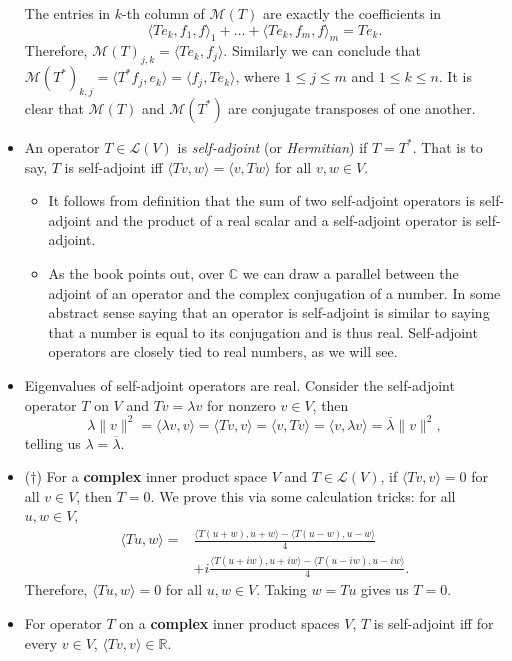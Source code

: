 \documentclass{article}
\newcommand{\R}{\mathbb{R}}
\newcommand{\C}{\mathbb{C}}
\newcommand{\conj}[1]{\overline{#1}}
\newcommand{\inp}[2]{\langle #1, #2 \rangle}
\newcommand{\nm}[1]{\| #1 \|}
\newcommand{\LV}{\mathcal{L}(V)}
\newcommand{\M}{\mathcal{M}}
\begin{document}
\begin{itemize}
    The entries in $k$-th column of $\M(T)$ are exactly the coefficients in
    $$\inp{Te_k,f_1}f_1+\dots+\inp{Te_k,f_m}f_m = Te_k.$$ Therefore, $\M(T)_{j,k} = \inp{Te_k}{f_j}$. Similarly we can conclude that $\M(T^*)_{k,j} = \inp{T^*f_j}{e_k} = \inp{f_j}{Te_k}$, where $1 \leq j \leq m$ and $1 \leq k \leq n$. It is clear that $\M(T)$ and $\M(T^*)$ are conjugate transposes of one another.
    \item An operator $T \in \LV$ is \textit{self-adjoint} (or \textit{Hermitian}) if $T=T^*$. That is to say, $T$ is self-adjoint iff $\inp{Tv}{w}=\inp{v}{Tw}$ for all $v,w \in V$.
    \begin{itemize}
        \item It follows from definition that the sum of two self-adjoint operators is self-adjoint and the product of a real scalar and a self-adjoint operator is self-adjoint.
        \item As the book points out, over $\C$ we can draw a parallel between the adjoint of an operator and the complex conjugation of a number. In some abstract sense saying that an operator is self-adjoint is similar to saying that a number is equal to its conjugation and is thus real. Self-adjoint operators are closely tied to real numbers, as we will see.
    \end{itemize}
    \item Eigenvalues of self-adjoint operators are real. Consider the self-adjoint operator $T$ on $V$ and $Tv = \lambda v$ for nonzero $v \in V$, then $$\lambda \nm{v}^2 = \inp{\lambda v}{v} = \inp{Tv}{v} = \inp{v}{Tv} = \inp{v}{\lambda v} = \conj{\lambda}\nm{v}^2,$$ telling us $\lambda = \conj{\lambda}$.
    \item ($\dagger$) For a \textbf{complex} inner product space $V$ and $T \in \LV$, if $\inp{Tv}{v}=0$ for all $v \in V$, then $T = 0$. We prove this via some calculation tricks: for all $u,w \in V$,
    \begin{align*}
        \inp{Tu}{w} = & \frac{\inp{T(u+w)}{u+w} - \inp{T(u-w)}{u-w}}{4} \\ & + i \frac{\inp{T(u+iw)}{u+iw} - \inp{T(u-iw)}{u-iw}}{4}.
    \end{align*}
    Therefore, $\inp{Tu}{w} = 0$ for all $u,w \in V$. Taking $w = Tu$ gives us $T = 0$.
    \item For operator $T$ on a \textbf{complex} inner product spaces $V$, $T$ is self-adjoint iff for every $v \in V$, $\inp{Tv}{v} \in \R$.
    

\end{itemize}
\end{document}
